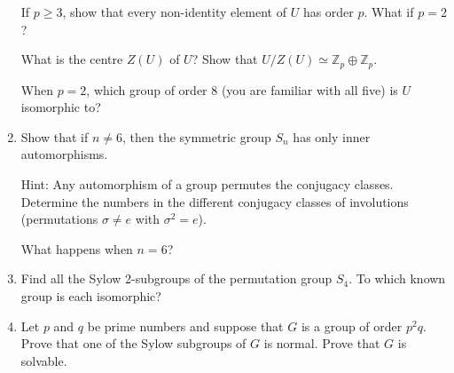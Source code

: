 \documentclass[12pt]{article}
\newcommand{\ZZ}{{\mathbb Z}}
\begin{document}
\begin{enumerate}
 If $p\geq 3$, show that every non-identity element of $U$ has order $p$.
 What if $p=2$?

 What is the centre $Z(U)$ of $U$?
 Show that $U/Z(U)\simeq \ZZ_p\oplus\ZZ_p$.

 When $p=2$, which group of order 8 (you are familiar with all five) is $U$ isomorphic to?

\item  Show that if $n\neq 6$, then the symmetric group $S_n$ has only inner automorphisms.

      Hint: Any automorphism of a group permutes the conjugacy classes.  Determine the
      numbers in the different conjugacy classes of involutions (permutations $\sigma\neq e$ 
      with $\sigma^2=e$).

      What happens when $n=6$?


%
\item   Find all the Sylow 2-subgroups of the permutation group $S_4$.
        To which known group is each isomorphic?      


%
\item
  Let $p$ and $q$ be prime numbers and suppose that $G$ is a group of order $p^2q$.
  Prove that one of the Sylow subgroups of $G$ is normal.
  Prove that $G$ is solvable. 

      
\end{enumerate}
\end{document}
